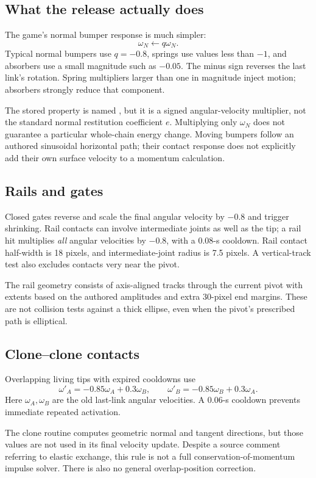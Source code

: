 \documentclass[11pt,a4paper]{article}
\newcommand{\code}[1]{\texttt{\detokenize{#1}}}
\begin{document}
\subsection{What the release actually does}
The game's normal bumper response is much simpler:
\[
 \omega_N\leftarrow q\omega_N.
\]
Typical normal bumpers use \(q=-0.8\), springs use values less than \(-1\), and absorbers use a small magnitude such as \(-0.05\). The minus sign reverses the last link's rotation. Spring multipliers larger than one in magnitude inject motion; absorbers strongly reduce that component.

The stored property is named \code{restitution}, but it is a signed angular-velocity multiplier, not the standard normal restitution coefficient \(e\). Multiplying only \(\omega_N\) does not guarantee a particular whole-chain energy change. Moving bumpers follow an authored sinusoidal horizontal path; their contact response does not explicitly add their own surface velocity to a momentum calculation.
\subsection{Rails and gates}
Closed gates reverse and scale the final angular velocity by \(-0.8\) and trigger shrinking. Rail contacts can involve intermediate joints as well as the tip; a rail hit multiplies \emph{all} angular velocities by \(-0.8\), with a 0.08-s cooldown. Rail contact half-width is 18 pixels, and intermediate-joint radius is 7.5 pixels. A vertical-track test also excludes contacts very near the pivot.

The rail geometry consists of axis-aligned tracks through the current pivot with extents based on the authored amplitudes and extra 30-pixel end margins. These are not collision tests against a thick ellipse, even when the pivot's prescribed path is elliptical.
\subsection{Clone--clone contacts}
Overlapping living tips with expired cooldowns use
\[
 \omega'_A=-0.85\omega_A+0.3\omega_B,\qquad
 \omega'_B=-0.85\omega_B+0.3\omega_A.
\]
Here \(\omega_A,\omega_B\) are the old last-link angular velocities. A 0.06-s cooldown prevents immediate repeated activation.
\begin{arcade}The clone routine computes geometric normal and tangent directions, but those values are not used in its final velocity update. Despite a source comment referring to elastic exchange, this rule is not a full conservation-of-momentum impulse solver. There is also no general overlap-position correction.\end{arcade}
\end{document}
